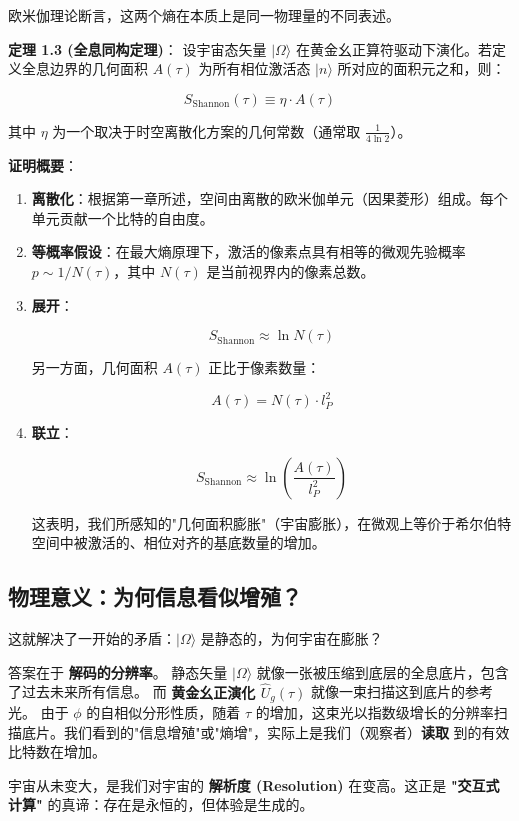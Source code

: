 欧米伽理论断言，这两个熵在本质上是同一物理量的不同表述。

\textbf{定理 1.3 (全息同构定理)}：
设宇宙态矢量 $|\Omega\rangle$ 在黄金幺正算符驱动下演化。若定义全息边界的几何面积 $A(\tau)$ 为所有相位激活态 $|n\rangle$ 所对应的面积元之和，则：

\[S_{\text{Shannon}}(\tau) \equiv \eta \cdot A(\tau)\]

其中 $\eta$ 为一个取决于时空离散化方案的几何常数（通常取 $\frac{1}{4 \ln 2}$）。

\textbf{证明概要}：

\begin{enumerate}
\item \textbf{离散化}：根据第一章所述，空间由离散的欧米伽单元（因果菱形）组成。每个单元贡献一个比特的自由度。
\item \textbf{等概率假设}：在最大熵原理下，激活的像素点具有相等的微观先验概率 $p \sim 1/N(\tau)$，其中 $N(\tau)$ 是当前视界内的像素总数。
\item \textbf{展开}：

\[S_{\text{Shannon}} \approx \ln N(\tau)\]

另一方面，几何面积 $A(\tau)$ 正比于像素数量：

\[A(\tau) = N(\tau) \cdot l_P^2\]

\item \textbf{联立}：

\[S_{\text{Shannon}} \approx \ln \left( \frac{A(\tau)}{l_P^2} \right)\]

这表明，我们所感知的"几何面积膨胀"（宇宙膨胀），在微观上等价于希尔伯特空间中被激活的、相位对齐的基底数量的增加。
\end{enumerate}

\subsection{物理意义：为何信息看似增殖？}

这就解决了一开始的矛盾：$|\Omega\rangle$ 是静态的，为何宇宙在膨胀？

答案在于 \textbf{解码的分辨率}。
静态矢量 $|\Omega\rangle$ 就像一张被压缩到底层的全息底片，包含了过去未来所有信息。
而 \textbf{黄金幺正演化 $\hat{U}_g(\tau)$} 就像一束扫描这到底片的参考光。
由于 $\phi$ 的自相似分形性质，随着 $\tau$ 的增加，这束光以指数级增长的分辨率扫描底片。我们看到的"信息增殖"或"熵增"，实际上是我们（观察者）\textbf{读取} 到的有效比特数在增加。

宇宙从未变大，是我们对宇宙的 \textbf{解析度 (Resolution)} 在变高。这正是 \textbf{"交互式计算"} 的真谛：存在是永恒的，但体验是生成的。
